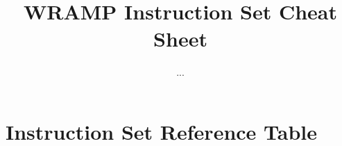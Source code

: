 \documentclass[a4paper]{book}
\title{WRAMP Instruction Set Cheat Sheet}
\author{...}
\begin{document}
\chapter*{Instruction Set Reference Table}
\addtolength{\hoffset}{-1cm}
\addtolength{\textwidth}{1cm}

\end{document}
